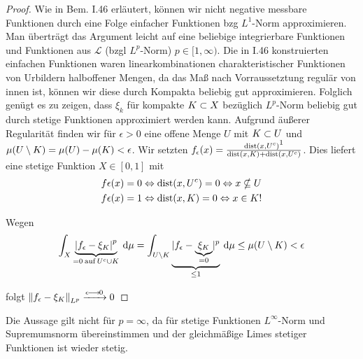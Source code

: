 \documentclass[skript.tex]{subfiles}
\begin{document}
\begin{proof}
	Wie in Bem. I.46 erläutert, können wir nicht negative messbare Funktionen durch eine Folge einfacher Funktionen bzg $L^1$-Norm approximieren. Man überträgt das Argument leicht auf eine beliebige integrierbare Funktionen und Funktionen aus $\mathscr{L}$ (bzgl $L^p$-Norm) $p \in [1,\infty)$. Die in I.46 konstruierten einfachen Funktionen waren linearkombinationen charakteristischer Funktionen von Urbildern halboffener Mengen, da das Maß nach Vorraussetztung regulär von innen ist, können wir diese durch Kompakta beliebig gut approximieren. Folglich genügt es zu zeigen, dass $\xi_k$ für kompakte $K \subset X$ bezüglich $L^p$-Norm beliebig gut durch stetige Funktionen approximiert werden kann. Aufgrund äußerer Regularität finden wir für $\epsilon>0$ eine offene Menge $U$ mit $K \subset U$ und $\mu(U \setminus K) = \mu(U) - \mu(K) < \epsilon$.
	Wir setzten $f_\epsilon(x) = \frac{\dist(x,U^c)\footnotemark}{\dist(x,K) + \dist(x,U^c)}$. Dies liefert eine stetige Funktion $ X \in [0,1]$ mit
	\begin{align*}
	f \epsilon(x) &= 0 \Leftrightarrow \operatorname{dist}(x,U^c)=0 \Leftrightarrow x \nsubseteq U \\
	f \epsilon(x) &= 1 \Leftrightarrow \operatorname{dist}(x,K)=0 \Leftrightarrow x \in K!
	\end{align*}

	Wegen
	\begin{equation*}
    \int_X \underbrace{\left| f_\epsilon - \xi_K \right|^p}_{=0 \: \text{auf} \: U^c \cup K} \: \mathrm{d} \mu = \int _{U \setminus K} \underbrace{ \lvert f_\epsilon - \underbrace{\xi_K}_{=0} \rvert^p}_{\leq 1} \: \mathrm{d} \mu \leq \mu(U \setminus K) < \epsilon
	\end{equation*}
	
	folgt $\left\lVert f_\epsilon - \xi_K \right\rVert_{L^p} \xrightarrow{\epsilon\kern -1pt \longrightarrow \kern -1pt 0} 0$
\end{proof}

	Die Aussage gilt nicht für $p = \infty$, da für stetige Funktionen $L^{\infty}$-Norm und Supremumsnorm übereinstimmen und der gleichmäßige Limes stetiger Funktionen ist wieder stetig.
\end{document}
